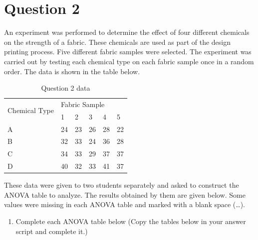 \documentclass[
  a4paper]{article}
\providecommand{\tightlist}{%
  \setlength{\itemsep}{0pt}\setlength{\parskip}{0pt}}
\begin{document}
\section{Question 2}\label{question-2}

An experiment was performed to determine the effect of four different
chemicals on the strength of a fabric. These chemicals are used as part
of the design printing process. Five different fabric samples were
selected. The experiment was carried out by testing each chemical type
on each fabric sample once in a random order. The data is shown in the
table below.

\begin{table}[!h]
\centering
\caption{Question 2 data}
\begin{tabular}{|l|lllll|}
\hline
\multirow{2}{*}{Chemical Type} & \multicolumn{5}{l|}{Fabric Sample}                                                                            \\ \cline{2-6} 
                 & \multicolumn{1}{l|}{1} & \multicolumn{1}{l|}{2} & \multicolumn{1}{l|}{3} & \multicolumn{1}{l|}{4} &  5 \\ \hline
            A      &  \multicolumn{1}{l|}{24} & \multicolumn{1}{l|}{23} & \multicolumn{1}{l|}{26} & \multicolumn{1}{l|}{28} & 22 \\ \hline
             B     & \multicolumn{1}{l|}{32} & \multicolumn{1}{l|}{33} & \multicolumn{1}{l|}{24} & \multicolumn{1}{l|}{36} & 28 \\ \hline
             C     & \multicolumn{1}{l|}{34} & \multicolumn{1}{l|}{33} & \multicolumn{1}{l|}{29} & \multicolumn{1}{l|}{37} & 37 \\ \hline
              D    & \multicolumn{1}{l|}{40} & \multicolumn{1}{l|}{32} & \multicolumn{1}{l|}{33} & \multicolumn{1}{l|}{41} & 37 \\ \hline
\end{tabular}
\end{table}

These data were given to two students separately and asked to construct
the ANOVA table to analyze. The results obtained by them are given
below. Some values were missing in each ANOVA table and marked with a
blank space (\ldots).

\begin{enumerate}
\def\labelenumi{\roman{enumi})}
\tightlist
\item
  Complete each ANOVA table below (Copy the tables below in your answer
  script and complete it.)
\end{enumerate}
\end{document}
